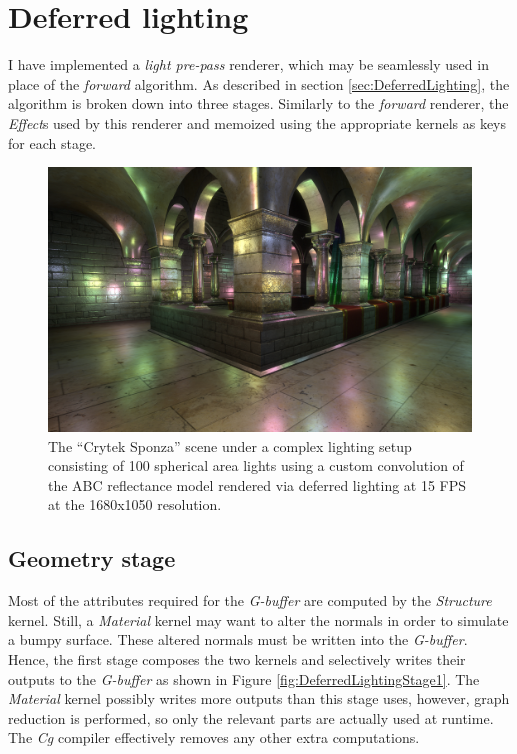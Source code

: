 

\clearpage
\section{Deferred lighting}
\label{sec:DeferredLightingExample}

I have implemented a \emph{light pre-pass} renderer, which may be seamlessly used in place of the \emph{forward} algorithm. As described in section \ref{sec:DeferredLighting}, the algorithm is broken down into three stages. Similarly to the \emph{forward} renderer, the \emph{Effect}s used by this renderer and memoized using the appropriate kernels as keys for each stage.

\begin{figure}[h!]
  \centering
    \includegraphics[width=0.9\linewidth]{./Figures/lightPrePass/sponza.jpg}
    \caption[Light pre-pass rendering of Sponza]{The ``Crytek Sponza'' scene under a complex lighting setup consisting of 100 spherical area lights using a custom convolution of the ABC reflectance model rendered via deferred lighting at 15 FPS at the 1680x1050 resolution.}
  \label{fig:lightPrePassSponza}
\end{figure}

\subsection{Geometry stage}

Most of the attributes required for the \emph{G-buffer} are computed by the \emph{Structure} kernel. Still, a \emph{Material} kernel may want to alter the normals in order to simulate a bumpy surface. These altered normals must be written into the \emph{G-buffer}. Hence, the first stage composes the two kernels and selectively writes their outputs to the \emph{G-buffer} as shown in Figure \ref{fig:DeferredLightingStage1}. The \emph{Material} kernel possibly writes more outputs than this stage uses, however, graph reduction is performed, so only the relevant parts are actually used at runtime. The \emph{Cg} compiler effectively removes any other extra computations.

